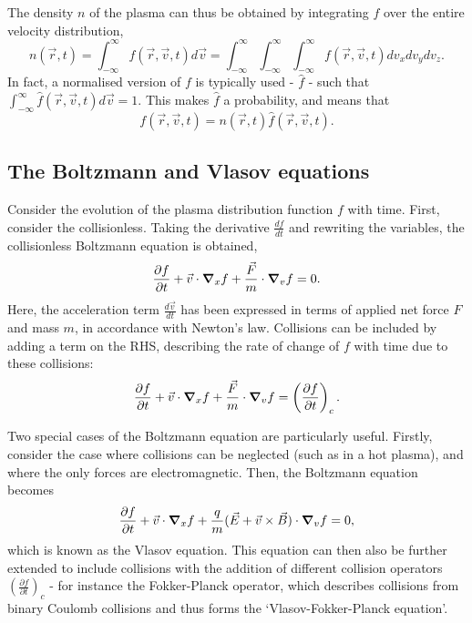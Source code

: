 The density $n$ of the plasma can thus be obtained by integrating $f$ over the entire velocity distribution,
\begin{equation} n(\vec{r}, t) = \int^{\infty}_{-\infty} f(\vec{r}, \vec{v}, t) d\vec{v}  = \int^{\infty}_{-\infty} \int^{\infty}_{-\infty} \int^{\infty}_{-\infty} f(\vec{r}, \vec{v}, t) dv_x dv_y dv_z. \end{equation}
In fact, a normalised version of $f$ is typically used - $\hat{f}$ - such that $\int^{\infty}_{-\infty} \hat{f}(\vec{r}, \vec{v}, t) d\vec{v} = 1$. This makes $\hat{f}$ a probability, and means that 
\begin{equation} f(\vec{r}, \vec{v}, t) = n(\vec{r}, t)\hat{f}(\vec{r}, \vec{v}, t). \end{equation}

\subsection{The Boltzmann and Vlasov equations}

Consider the evolution of the plasma distribution function $f$ with time. First, consider the collisionless. Taking the derivative $\frac{df}{dt}$ and rewriting the variables, the collisionless Boltzmann equation is obtained,
\begin{equation} \frac{\partial f}{\partial t} + \vec{v}\cdot \grad_x f + \frac{\vec{F}}{m} \cdot \grad_v f = 0. \end{equation}
Here, the acceleration term $\frac{d\vec{v}}{dt}$ has been expressed in terms of applied net force $F$ and mass $m$, in accordance with Newton's law. Collisions can be included by adding a term on the RHS, describing the rate of change of $f$ with time due to these collisions: 
\begin{equation} \frac{\partial f}{\partial t} + \vec{v}\cdot \grad_x f + \frac{\vec{F}}{m} \cdot \grad_v f = \left(\frac{\partial f}{\partial t}\right)_c. \end{equation}

Two special cases of the Boltzmann equation are particularly useful. Firstly, consider the case where collisions can be neglected (such as in a hot plasma), and where the only forces are electromagnetic. Then, the Boltzmann equation becomes
\begin{equation} \frac{\partial f}{\partial t} + \vec{v}\cdot \grad_x f + \frac{q}{m}(\vec{E} + \vec{v}\times\vec{B}) \cdot \grad_v f = 0, \end{equation}
which is known as the Vlasov equation. This equation can then also be further extended to include collisions with the addition of different collision operators $\left(\frac{\partial f}{\partial t}\right)_c$ - for instance the Fokker-Planck operator, which describes collisions from binary Coulomb collisions and thus forms the `Vlasov-Fokker-Planck equation'.

